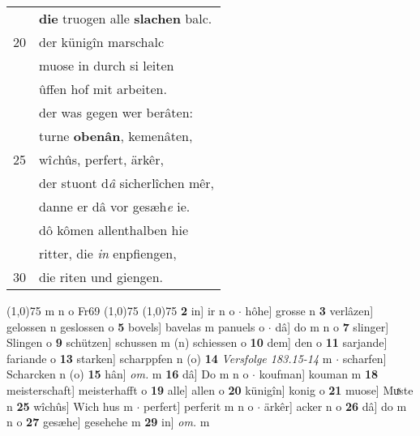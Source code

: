 \documentclass[8pt,a4paper,notitlepage]{article}
\begin{document}
\begin{table}[ht]
\begin{minipage}[t]{0.5\linewidth}
\begin{tabular}{rl}
 & \textbf{die} truogen alle \textbf{slachen} balc.\\ 
20 & der künigîn marschalc\\ 
 & muose in durch si leiten\\ 
 & ûffen hof mit arbeiten.\\ 
 & der was gegen wer berâten:\\ 
 & turne \textbf{obenân}, kemenâten,\\ 
25 & wî\textit{c}hûs, perfert, ärkêr,\\ 
 & der stuont d\textit{â} sicherlîchen mêr,\\ 
 & danne er dâ vor gesæh\textit{e} ie.\\ 
 & dô kômen allenthalben hie\\ 
 & ritter, die \textit{in} enpfiengen,\\ 
30 & die riten und giengen.\\ 
\end{tabular}
\scriptsize
\line(1,0){75} \newline
m n o Fr69 \newline
\line(1,0){75} \newline
\newline
\line(1,0){75} \newline
\textbf{2} in] ir n o  $\cdot$ hôhe] grosse n \textbf{3} verlâzen] gelossen n geslossen o \textbf{5} bovels] bavelas m panuels o  $\cdot$ dâ] do m n o \textbf{7} slinger] Slingen o \textbf{9} schützen] schussen m (n) schiessen o \textbf{10} dem] den o \textbf{11} sarjande] fariande o \textbf{13} starken] scharppfen n (o) \textbf{14} \textit{Versfolge 183.15-14} m   $\cdot$ scharfen] Scharcken n (o) \textbf{15} hân] \textit{om.} m \textbf{16} dâ] Do m n o  $\cdot$ koufman] kouman m \textbf{18} meisterschaft] meisterhafft o \textbf{19} alle] allen o \textbf{20} künigîn] konig o \textbf{21} muose] Muͯste n \textbf{25} wîchûs] Wich hus m  $\cdot$ perfert] perferit m n o  $\cdot$ ärkêr] acker n o \textbf{26} dâ] do m n o \textbf{27} gesæhe] gesehehe m \textbf{29} in] \textit{om.} m \newline
\end{minipage}
\end{table}
\newpage
\end{document}
